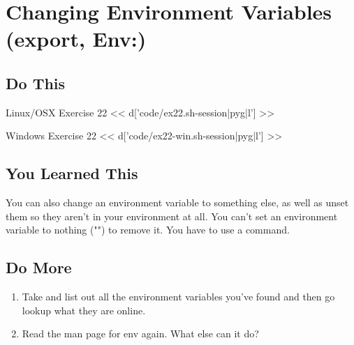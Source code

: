 \chapter{Changing Environment Variables (export, Env:)}

\section{Do This}

\begin{code}{Linux/OSX Exercise 22}
<< d['code/ex22.sh-session|pyg|l'] >>
\end{code}

\begin{code}{Windows Exercise 22}
<< d['code/ex22-win.sh-session|pyg|l'] >>
\end{code}

\section{You Learned This}

You can also change an environment variable to something else, as well as
unset them so they aren't in your environment at all.  You can't set an
environment variable to nothing ("") to remove it.  You have to use a 
command.

\section{Do More}

\begin{enumerate}
\item Take and list out all the environment variables you've found and 
    then go lookup what they are online.
\item Read the man page for env again.  What else can it do?
\end{enumerate}

